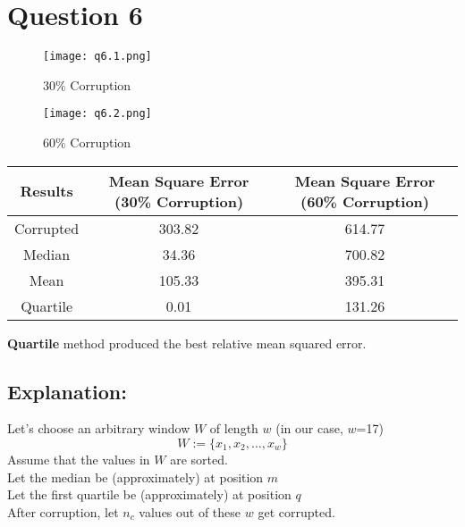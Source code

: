 \documentclass[11pt]{article}
\begin{document}
\section*{Question 6}
\setcounter{equation}{0}
\begin{figure}[H]
    \centering
    \texttt{[image: q6.1.png]}
    \caption{$30\%$ Corruption}
\end{figure}
\begin{figure}[H]
    \centering
    \texttt{[image: q6.2.png]}
    \caption{$60\%$ Corruption}
\end{figure}
\begin{center}
    \begin{tabular}{|c|c|c|}
        \hline
        \textbf{Results} & \textbf{Mean Square Error (30\% Corruption)} & \textbf{Mean Square Error (60\% Corruption)} \\
        \hline
        Corrupted        & 303.82                                       & 614.77                                       \\
        \hline
        Median           & 34.36                                        & 700.82                                       \\
        \hline
        Mean             & 105.33                                        &  395.31                                       \\
        \hline
        Quartile         & 0.01                                         & 131.26                                      \\
        \hline
    \end{tabular}
\end{center}

\textbf{Quartile} method produced the best relative mean squared error.
\subsection*{Explanation:}
Let's choose an arbitrary window $W$ of length $w$ (in our case, $w$=17)
$$ W := \{ x_1, x_2, \ldots, x_w \} $$
Assume that the values in $W$ are sorted.\\
Let the median be (approximately) at position $m$\\
Let the first quartile be (approximately) at position $q$\\
After corruption, let $n_c$ values out of these $w$ get corrupted.
\end{document}
